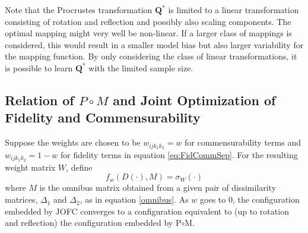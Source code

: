 \documentclass[12pt,oneside,final]{thesis}\usepackage[]{graphicx}\usepackage[]{color}
\begin{document}
Note that the Procrustes transformation $\mathbf{Q}^*$  is limited to  a linear transformation consisting of rotation and reflection and possibly also scaling components. The optimal mapping might  very well be   non-linear. If a larger class of mappings is considered, this would result in a smaller model bias but also larger variability for the mapping function. By only considering the class of linear transformations, it is possible to learn $\mathbf{Q}^{*}$ with the limited sample size.

\subsection{Relation of $P\circ M$ and Joint Optimization of Fidelity and Commensurability} 

Suppose the weights are chosen to be $w_{ijk_1k_2}=w$ for commensurability terms and $w_{ijk_1k_2}=1-w$ for fidelity terms in equation \eqref{eq:FidCommSep}. For the resulting weight matrix $W$, define 
\begin{equation}
f_w(D(\cdot),M) = \sigma_W(\cdot) \label{fid-comm-tradeoff-func}
\end{equation}
 where $M$ is the omnibus matrix obtained from  a given pair of dissimilarity matrices, $\Delta_1$ and $\Delta_2$, as in equation \eqref{omnibus}.   As $w$ goes to 0, the configuration embedded by JOFC converges to a configuration equivalent to (up to rotation and reflection)  the configuration embedded by P$\circ$M.
\end{document}
